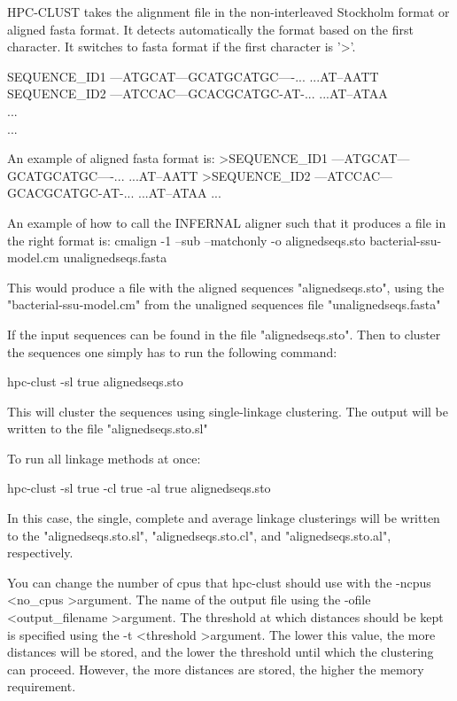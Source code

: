 \documentclass[10pt,a4paper]{article}
\begin{document}
HPC-CLUST takes the alignment file in the non-interleaved Stockholm format or aligned fasta format.
It detects automatically the format based on the first character. It switches to fasta format if the first
character is '\textgreater'.

SEQUENCE\_ID1      ---ATGCAT---GCATGCATGC----... ...AT--AATT\\
SEQUENCE\_ID2      ---ATCCAC---GCACGCATGC-AT-... ...AT--ATAA\\
...\\
...

An example of aligned fasta format is:
{\textgreater}SEQUENCE\_ID1
---ATGCAT---GCATGCATGC----... ...AT--AATT
{\textgreater}SEQUENCE\_ID2
---ATCCAC---GCACGCATGC-AT-... ...AT--ATAA
...


An example of how to call the INFERNAL aligner such that it produces a file in the
right format is:
cmalign -1 --sub --matchonly -o alignedseqs.sto bacterial-ssu-model.cm unalignedseqs.fasta

This would produce a file with the aligned sequences "alignedseqs.sto", using the
"bacterial-ssu-model.cm" from the unaligned sequences file "unalignedseqs.fasta"

If the input sequences can be found in the file "alignedseqs.sto". Then to cluster the
sequences one simply has to run the following command:

hpc-clust -sl true alignedseqs.sto

This will cluster the sequences using single-linkage clustering. The output will be written
to the file "alignedseqs.sto.sl"

To run all linkage methods at once:

hpc-clust -sl true -cl true -al true alignedseqs.sto

In this case, the single, complete and average linkage clusterings will be written to the
"alignedseqs.sto.sl", "alignedseqs.sto.cl", and "alignedseqs.sto.al", respectively.

You can change the number of cpus that hpc-clust should use with the -ncpus \textless no\_cpus \textgreater argument.
The name of the output file using the -ofile \textless output\_filename \textgreater argument.
The threshold at which distances should be kept is specified using the -t \textless threshold \textgreater argument.
The lower this value, the more distances will be stored, and the lower the threshold until which
the clustering can proceed. However, the more distances are stored, the higher the memory 
requirement.
\end{document}
